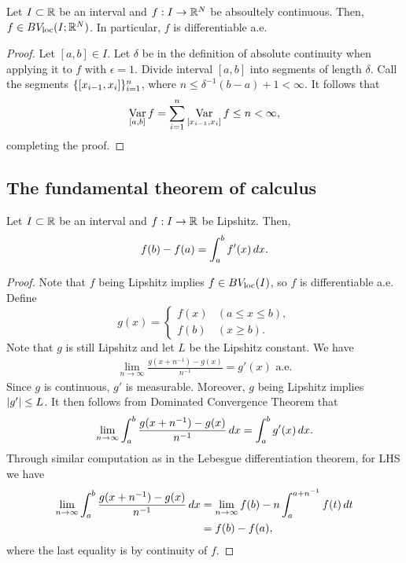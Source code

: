 \documentclass[a4paper]{article}
\begin{document}
\begin{thm}
  Let $I \subset \mathbb{R}$ be an interval and $f : I \to \mathbb{R}^N$ be absoultely
  continuous. Then, $f \in BV_{\mathrm{loc}} (I ; \mathbb{R}^N)$. In particular, $f$ is
  differentiable a.e.
\end{thm}

\begin{proof}

  Let $[a, b] \in I$. Let $\delta$ be in the definition of absolute
  continuity when applying it to $f$ with $\epsilon = 1$. Divide interval
  $[a, b]$ into segments of length $\delta$. Call the segments
  $\{ [x_{i - 1}, x_i] \}_{i=1}^n$, where $n \leq \delta^{-1}(b - a) + 1 <
  \infty$. It follows that
  \begin{align*}
    \operatorname*{Var}_{[a, b]} f
    = \sum_{i=1}^n \operatorname*{Var}_{[x_{i - 1}, x_i]} f
    \leq n
    < \infty,
  \end{align*}
  completing the proof.
\end{proof}

\subsection{The fundamental theorem of calculus}

\begin{thm}
  Let $I \subset \mathbb{R}$ be an interval and $f : I \to \mathbb{R}$ be Lipshitz. Then,
  \[
    f(b) - f(a) = \int_a^b f'(x) \, d x.
  \]
\end{thm}

\begin{proof}
  Note that $f$ being Lipshitz implies $f \in BV_{\mathrm{loc}} (I)$, so $f$ is
  differentiable a.e. Define
  \[
    g(x) = \begin{cases}
      f(x) & (a \leq x \leq b), \\
      f(b) & (x \geq b).
    \end{cases}
  \]
  Note that $g$ is still Lipshitz and let $L$ be the Lipshitz constant. We
  have
  \begin{align*}
    \lim_{n \to \infty} \frac{g(x + n^{-1}) - g(x)}{n^{-1}}
    = g'(x) \text{ a.e.}
  \end{align*}
  Since $g$ is continuous, $g'$ is measurable. Moreover, $g$ being
  Lipshitz implies $\left\lvert g'\right\rvert \leq L$. It then follows from Dominated
  Convergence Theorem that
  \[
    \lim_{n \to \infty} \int_a^b \frac{g(x + n^{-1}) - g(x)}{n^{-1}} \, d x
    = \int_a^b g'(x) \, d x.
  \]
  Through similar computation as in the Lebesgue differentiation theorem,
  for LHS we have
  \begin{align*}
    \lim_{n \to \infty} \int_a^b \frac{g(x + n^{-1}) - g(x)}{n^{-1}} \, d x
     & = \lim_{n \to \infty} f(b) - n \int_a^{a + n^{-1}} f(t) \, d t \\
     & = f(b) - f(a),
  \end{align*}
  where the last equality is by continuity of $f$.
\end{proof}
\end{document}
